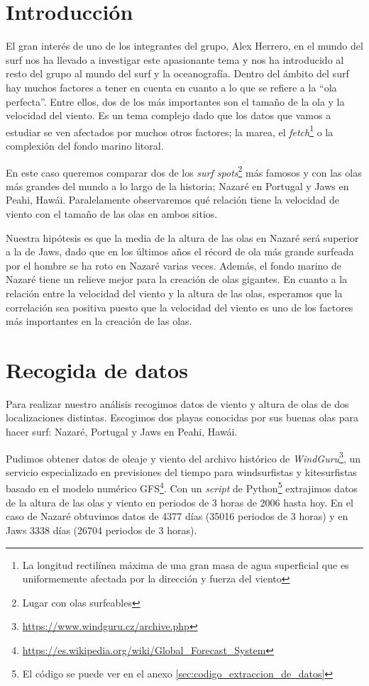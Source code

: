 \section{Introducción}%
\label{sec:introduccion}
El gran interés de uno de los integrantes del grupo, Alex Herrero, en el mundo del surf nos ha llevado a investigar este apasionante tema y nos ha introducido al resto del grupo al mundo del surf y la oceanografía. Dentro del ámbito del surf hay muchos factores a tener en cuenta en cuanto a lo que se refiere a la ``ola perfecta''. Entre ellos, dos de los más importantes son el tamaño de la ola y la velocidad del viento. Es un tema complejo dado que los datos que vamos a estudiar se ven afectados por muchos otros factores; la marea, el \textit{fetch}\footnote{La longitud rectilínea máxima de una gran masa de agua superficial que es uniformemente afectada por la dirección y fuerza del viento} o la complexión del fondo marino litoral.

En este caso queremos comparar dos de los \textit{surf spots}\footnote{Lugar con olas surfeables} más famosos y con las olas más grandes del mundo a lo largo de la historia; Nazaré en Portugal y Jaws en Peahi, Hawái. Paralelamente observaremos qué relación tiene la velocidad de viento con el tamaño de las olas en ambos sitios.

Nuestra hipótesis es que la media de la altura de las olas en Nazaré será superior a la de Jaws, dado que en los últimos años el récord de ola más grande surfeada por el hombre se ha roto en Nazaré varias veces. Además, el fondo marino de Nazaré tiene un relieve mejor para la creación de olas gigantes. En cuanto a la relación entre la velocidad del viento y la altura de las olas, esperamos que la correlación sea positiva
puesto que la velocidad del viento es uno de los factores más importantes en la creación de las olas.

\section{Recogida de datos}%
\label{sec:recogida_de_datos}
Para realizar nuestro análisis recogimos datos de viento y altura de olas de
dos localizaciones distintas. Escogimos dos playas conocidas por sus buenas
olas para hacer surf: Nazaré, Portugal y Jaws en Peahi, Hawái.

Pudimos obtener datos de oleaje y viento del archivo histórico de \emph{WindGuru}\footnote{\url{https://www.windguru.cz/archive.php}}, un servicio especializado en previsiones del tiempo para windsurfistas y kitesurfistas basado en el modelo numérico GFS\footnote{\url{https://es.wikipedia.org/wiki/Global_Forecast_System}}. Con un \textit{script} de
Python\footnote{El código se puede ver en el anexo
  \ref{sec:codigo_extraccion_de_datos}} extrajimos datos de la altura de las
olas y viento en periodos de 3 horas de 2006 hasta hoy. En el caso de Nazaré
obtuvimos datos de 4377 días (35016 periodos de 3 horas) y en Jaws 3338 días
(26704 periodos de 3 horas).

